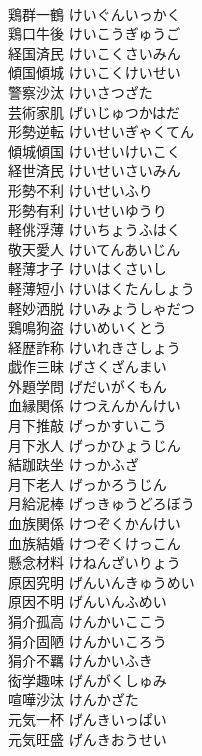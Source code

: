 \documentclass[8pt]{extreport}
\begin{document}
\begin{CJK}{UTF8}{min}
\\	鶏群一鶴	けいぐんいっかく	
\\	鶏口牛後	けいこうぎゅうご	
\\	経国済民	けいこくさいみん	
\\	傾国傾城	けいこくけいせい	
\\	警察沙汰	けいさつざた	
\\	芸術家肌	げいじゅつかはだ	
\\	形勢逆転	けいせいぎゃくてん	
\\	傾城傾国	けいせいけいこく	
\\	経世済民	けいせいさいみん	
\\	形勢不利	けいせいふり	
\\	形勢有利	けいせいゆうり	
\\	軽佻浮薄	けいちょうふはく	
\\	敬天愛人	けいてんあいじん	
\\	軽薄才子	けいはくさいし	
\\	軽薄短小	けいはくたんしょう	
\\	軽妙洒脱	けいみょうしゃだつ	
\\	鶏鳴狗盗	けいめいくとう	
\\	経歴詐称	けいれきさしょう	
\\	戯作三昧	げさくざんまい	
\\	外題学問	げだいがくもん	
\\	血縁関係	けつえんかんけい	
\\	月下推敲	げっかすいこう	
\\	月下氷人	げっかひょうじん	
\\	結跏趺坐	けっかふざ	
\\	月下老人	げっかろうじん	
\\	月給泥棒	げっきゅうどろぼう	
\\	血族関係	けつぞくかんけい	
\\	血族結婚	けつぞくけっこん	
\\	懸念材料	けねんざいりょう	
\\	原因究明	げんいんきゅうめい	
\\	原因不明	げんいんふめい	
\\	狷介孤高	けんかいここう	
\\	狷介固陋	けんかいころう	
\\	狷介不羈	けんかいふき	
\\	衒学趣味	げんがくしゅみ	
\\	喧嘩沙汰	けんかざた	
\\	元気一杯	げんきいっぱい	
\\	元気旺盛	げんきおうせい	

\end{CJK}
\end{document}
